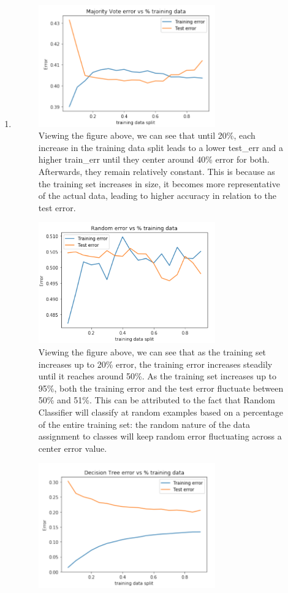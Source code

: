 \documentclass[11pt]{article}
\newcommand{\solution}[1]{{{\color{blue}{\bf Solution:} {#1}}}}
\begin{document}
\begin{enumerate}
\item
\solution{
\begin{figure}[!htbp]
    \centering
    \includegraphics[width=3in]{5f-majority.png}
    \caption{Viewing the figure above, we can see that until 20\%, each increase in the training data split leads to a lower test\_err and a higher train\_err until they center around 40\% error for both. Afterwards, they remain relatively constant. This is because as the training set increases in size, it becomes more representative of the actual data, leading to higher accuracy in relation to the test error.}
\end{figure}
\vspace{1cm}
\begin{figure}[!htbp]
    \centering
    \includegraphics[width=3in]{5f-random.png}
    \caption{Viewing the figure above, we can see that as the training set increases up to 20\% error, the training error increases steadily until it reaches around 50\%. As the training set increases up to 95\%, both the training error and the test error fluctuate between 50\% and 51\%. This can be attributed to the fact that Random Classifier will classify at random examples based on a percentage of the entire training set: the random nature of the data assignment to classes will keep random error fluctuating across a center error value.}
\end{figure}
\begin{figure}[!htbp]
    \centering
    \includegraphics[width=3in]{5f-tree.png}

\end{figure}}
\end{enumerate}
\end{document}
